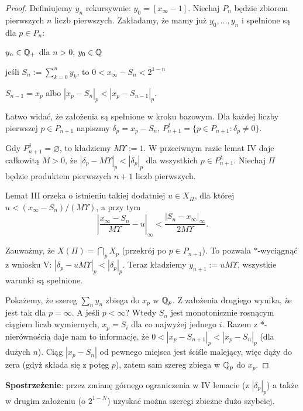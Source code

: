 \begin{proof}
	Definiujemy $y_n$ rekursywnie: $y_0 = [x_\infty -1]$.
	Niechaj $P_n$ będzie zbiorem pierwszych $n$ liczb pierwszych.
	Zakładamy, że mamy już $y_0, \dots, y_n$ i spełnione są dla $p \in P_n$:
	\begin{enumx}
	\item $y_n \in \mathbb Q_+$ dla $n > 0$, $y_0 \in \mathbb Q$
	\item jeśli $S_n := \sum_{k=0}^n y_k$, to $0 < x_\infty - S_n < 2^{1-n}$
	\item $S_{n-1} = x_p$ albo $|x_p - S_n|_p < |x_p - S_{n-1}|_p$.
	\end{enumx}
	
	Łatwo widać, że założenia są spełnione w kroku bazowym.
	Dla każdej liczby pierwszej $p \in P_{n+1}$ napiszmy $\delta_p = x_p - S_n$, $P_{n+1}^\delta = \{p \in P_{n+1}: \delta_p \neq 0\}$.
	
	Gdy $P^\delta_{n+1} = \varnothing$, to kładziemy $M \Upsilon := 1$.
	W przeciwnym razie lemat IV daje całkowitą $M > 0$, że $|\delta_p - M \Upsilon|_p < |\delta_p|_p$ dla wszystkich $p \in P^\delta_{n+1}$.
	Niechaj $\Pi$ będzie produktem pierwszych $n+1$ liczb pierwszych.
	
	Lemat III orzeka o istnieniu takiej dodatniej $u \in X_\Pi$, dla której $u < (x_\infty - S_n) / (M\Upsilon)$, a przy tym
	\[
		\left|\frac{x_\infty-S_n}{M \Upsilon} - u\right|_\infty < \frac{|S_n - x_\infty|_\infty}{2 M \Upsilon}.
	\]

	Zauważmy, że $X(\Pi) = \bigcap_p X_p$ (przekrój po $p \in P_{n+1}$).
	To pozwala $*$-wyciągnąć z wniosku V: $|\delta_p - u M \Upsilon|_p < |\delta_p|_p$.
	Teraz kładziemy $y_{n+1} := u M \Upsilon$, wszystkie warunki są spełnione.

	Pokażemy, że szereg $\sum_n y_n$ zbiega do $x_p$ w $\mathbb Q_p$.
	Z założenia drugiego wynika, że jest tak dla $p = \infty$.
	A jeśli $p < \infty$?
	Wtedy $S_n$ jest monotonicznie rosnącym ciągiem liczb wymiernych, $x_p = S_i$ dla co najwyżej jednego $i$.
	Razem z $*$-nierównością daje nam to informację, że $0 < |x_p - S_{n+1}|_p < |x_p - S_n|_p$ (dla dużych $n$).
	Ciąg $|x_p - S_n|$ od pewnego miejsca jest ściśle malejący, więc dąży do zera (gdyż składa się z potęg $p$), zatem sam szereg zbiega w $\mathbb Q_p$ do $x_p$.
\end{proof}

\textbf{Spostrzeżenie}: przez zmianę górnego ograniczenia w IV lemacie (z $|\delta_p|_p$) a także w drugim założeniu (o $2^{1-N}$) uzyskać można szeregi zbieżne dużo szybciej.